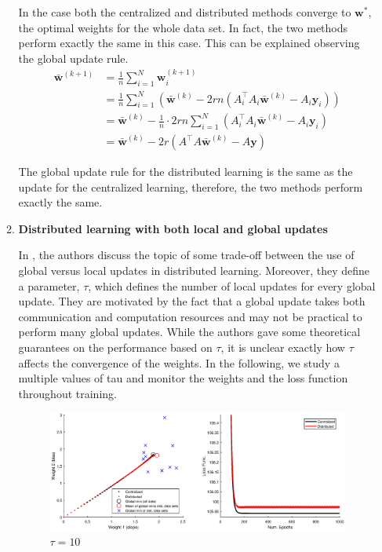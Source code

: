 \documentclass[11pt, fullpage,letterpaper]{article}
\newcommand{\tbf}{\textbf}
\begin{document}
\begin{enumerate}
\begin{enumerate}
  In the case both the centralized and distributed methods converge to $\boldsymbol{w}^*$, the optimal weights for the whole data set. In fact, the two methods perform exactly the same in this case. This can be explained observing the global update rule.
  \begin{align}
  \bar{\boldsymbol{w}}^{(k+1)} &= \frac{1}{n}\sum_{i=1}^{N}\boldsymbol{w}_i^{(k+1)} \\
  &= \frac{1}{n}\sum_{i=1}^{N}\left(\bar{\boldsymbol{w}}^{(k)} - 2rn(A_i^\intercal A_i \boldsymbol\bar{\boldsymbol{w}}^{(k)} - A_i \boldsymbol{y}_i)\right)\\
  &= \bar{\boldsymbol{w}}^{(k)} - \frac{1}{n}\cdot 2rn \sum_{i=1}^{N}\left(A_i^\intercal A_i \boldsymbol\bar{\boldsymbol{w}}^{(k)} - A_i \boldsymbol{y}_i\right) \\
  &= \bar{\boldsymbol{w}}^{(k)} - 2r(A^\intercal A \boldsymbol\bar{\boldsymbol{w}}^{(k)} - A \boldsymbol{y})
    \end{align}

  The global update rule for the distributed learning is the same as the update for the centralized learning, therefore, the two methods perform exactly the same.

  \item \tbf{Distributed learning with both local and global updates}

   In \cite{ref4}, the authors discuss the topic of some trade-off between the use of global versus local updates in distributed learning. Moreover, they define a parameter, $\tau$, which defines the number of local updates for every global update. They are motivated by the fact that a global update takes both communication and computation resources and may not be practical to perform many global updates. While the authors gave some theoretical guarantees on the performance based on $\tau$, it is unclear exactly how $\tau$ affects the convergence of the weights. In the following, we study a multiple values of tau and monitor the weights and the loss function throughout training.

   \begin{figure}[H]
\begin{center}
\advance\leftskip-3cm
\advance\rightskip-3cm
\includegraphics[width=20cm]{tau=10.eps}
\caption{$\tau=10$}
\end{center}\end{figure}


\end{enumerate}
\end{enumerate}
\end{document}
